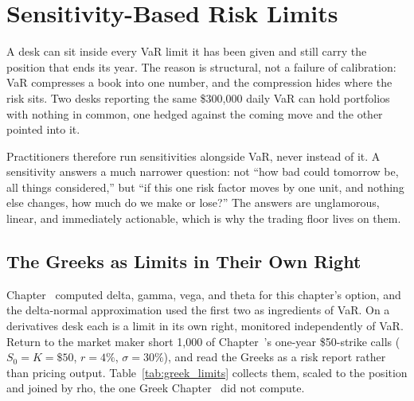 \documentclass[../ai_in_finance]{subfiles}
\begin{document}
\section{Sensitivity-Based Risk Limits}
\label{sec:sensitivity-limits}

A desk can sit inside every VaR limit it has been given and still carry the position that ends its year. The reason is structural, not a failure of calibration: VaR compresses a book into one number, and the compression hides where the risk sits. Two desks reporting the same \$300,000 daily VaR can hold portfolios with nothing in common, one hedged against the coming move and the other pointed into it.

Practitioners therefore run sensitivities alongside VaR, never instead of it. A sensitivity answers a much narrower question: not ``how bad could tomorrow be, all things considered,'' but ``if this one risk factor moves by one unit, and nothing else changes, how much do we make or lose?'' The answers are unglamorous, linear, and immediately actionable, which is why the trading floor lives on them.

\subsection{The Greeks as Limits in Their Own Right}
\label{sec:greeks-limits}

Chapter~ computed delta, gamma, vega, and theta for this chapter's option, and the delta-normal approximation used the first two as ingredients of VaR. On a derivatives desk each is a limit in its own right, monitored independently of VaR. Return to the market maker short 1,000 of Chapter~'s one-year \$50-strike calls ($S_0=K=\$50$, $r=4\%$, $\sigma=30\%$), and read the Greeks as a risk report rather than pricing output. Table~\ref{tab:greek_limits} collects them, scaled to the position and joined by rho, the one Greek Chapter~ did not compute.
\end{document}
